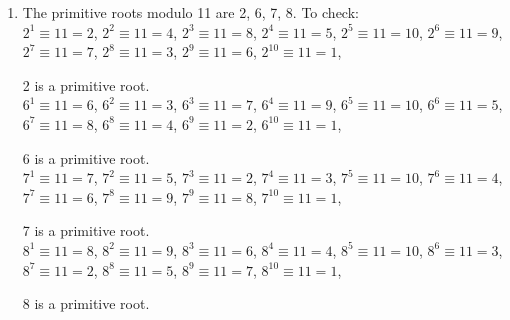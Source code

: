 {\begin{enumerate}
\begin{enumerate}[label=(\roman*)]
\(3^{4} \equiv 38\),
\(3^{5} \equiv 28\),
\(3^{6} \equiv 41\),
\(3^{7} \equiv 37\),
\(3^{8} \equiv 25\),
\(3^{9} \equiv 32\),
\(3^{10} \equiv 10\),
\(3^{11} \equiv 30\),
\(3^{12} \equiv 4\),
\(3^{13} \equiv 12\),
\(3^{14} \equiv 36\),
\(3^{15} \equiv 22\),
\(3^{16} \equiv 23\),
\(3^{17} \equiv 26\),
\(3^{18} \equiv 35\),
\(3^{19} \equiv 19\),
\(3^{20} \equiv 14\),
\(3^{21} \equiv 42\),
\(3^{22} \equiv 40\),
\(3^{23} \equiv 34\),
\(3^{24} \equiv 16\),
\(3^{25} \equiv 5\),
\(3^{26} \equiv 15\),
\(3^{27} \equiv 2\),
\(3^{28} \equiv 6\),
\(3^{29} \equiv 18\),
\(3^{30} \equiv 11\),
\(3^{31} \equiv 33\),
\(3^{32} \equiv 13\),
\(3^{33} \equiv 39\),
\(3^{34} \equiv 31\),
\(3^{35} \equiv 7\),
\(3^{36} \equiv 21\),
\(3^{37} \equiv 20\),
\(3^{38} \equiv 17\),
\(3^{39} \equiv 8\),
\(3^{40} \equiv 24\),
\(3^{41} \equiv 29\),
\(3^{42} \equiv 1\), \\
\(3\) is a primitive root.
    \end{enumerate}
    \item The primitive roots modulo 11 are 2, 6, 7, 8. To check: \\
    \(2^1 \equiv 11 = 2\),
\(2^2 \equiv 11 = 4\),
\(2^3 \equiv 11 = 8\),
\(2^4 \equiv 11 = 5\),
\(2^5 \equiv 11 = 10\),
\(2^6 \equiv 11 = 9\),
\(2^7 \equiv 11 = 7\),
\(2^8 \equiv 11 = 3\),
\(2^9 \equiv 11 = 6\),
\(2^{10} \equiv 11 = 1\),

2 is a primitive root. \\

\(6^1 \equiv 11 = 6\),
\(6^2 \equiv 11 = 3\),
\(6^3 \equiv 11 = 7\),
\(6^4 \equiv 11 = 9\),
\(6^5 \equiv 11 = 10\),
\(6^6 \equiv 11 = 5\),
\(6^7 \equiv 11 = 8\),
\(6^8 \equiv 11 = 4\),
\(6^9 \equiv 11 = 2\),
\(6^{10} \equiv 11 = 1\),

6 is a primitive root. \\

\(7^1 \equiv 11 = 7\),
\(7^2 \equiv 11 = 5\),
\(7^3 \equiv 11 = 2\),
\(7^4 \equiv 11 = 3\),
\(7^5 \equiv 11 = 10\),
\(7^6 \equiv 11 = 4\),
\(7^7 \equiv 11 = 6\),
\(7^8 \equiv 11 = 9\),
\(7^9 \equiv 11 = 8\),
\(7^{10} \equiv 11 = 1\),

7 is a primitive root. \\

\(8^1 \equiv 11 = 8\),
\(8^2 \equiv 11 = 9\),
\(8^3 \equiv 11 = 6\),
\(8^4 \equiv 11 = 4\),
\(8^5 \equiv 11 = 10\),
\(8^6 \equiv 11 = 3\),
\(8^7 \equiv 11 = 2\),
\(8^8 \equiv 11 = 5\),
\(8^9 \equiv 11 = 7\),
\(8^{10} \equiv 11 = 1\),

8 is a primitive root.
\end{enumerate}
}

